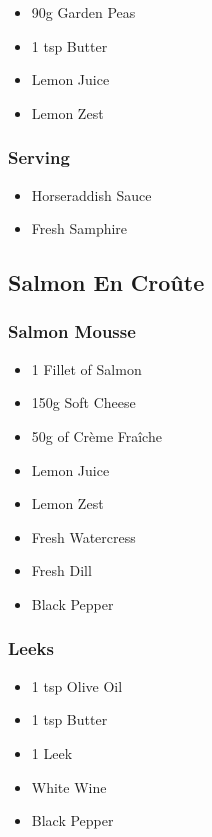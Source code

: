 \documentclass[11pt, english]{article}
\begin{document}
	\begin{itemize}
        \setlength\itemsep{0cm}
		\item 90g Garden Peas
		\item 1 tsp Butter
		\item Lemon Juice
		\item Lemon Zest		
        \end{itemize}

		\subsubsection*{Serving}

	\begin{itemize}
        \setlength\itemsep{0cm}
		\item Horseraddish Sauce
		\item Fresh Samphire
        \end{itemize}

\newpage

	\subsection{Salmon En Cro\^{u}te}

		\subsubsection*{Salmon Mousse}

	\begin{itemize}
        \setlength\itemsep{0cm}
                \item 1 Fillet of Salmon
		\item 150g Soft Cheese
		\item 50g of Cr\`{e}me Fra\^{i}che
		\item Lemon Juice
		\item Lemon Zest
		\item Fresh Watercress
		\item Fresh Dill
		\item Black Pepper
        \end{itemize}

		\subsubsection*{Leeks}

	\begin{itemize}
        \setlength\itemsep{0cm}
		\item 1 tsp Olive Oil
		\item 1 tsp Butter
		\item 1 Leek
		\item White Wine
		\item Black Pepper
        \end{itemize}
\end{document}
